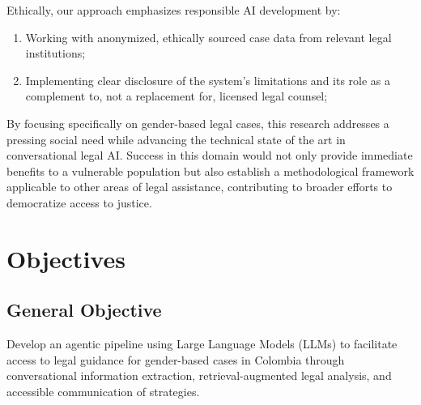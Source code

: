 Ethically, our approach emphasizes responsible AI development by:

\begin{enumerate}
\item Working with anonymized, ethically sourced case data from relevant legal institutions;
\item Implementing clear disclosure of the system’s limitations and its role as a complement to, not a replacement for, licensed legal counsel;
\end{enumerate}

By focusing specifically on gender-based legal cases, this research 
addresses a pressing social need while advancing the technical state 
of the art in conversational legal AI. Success in this domain would 
not only provide immediate benefits to a vulnerable population but also 
establish a methodological framework applicable to other areas of legal 
assistance, contributing to broader efforts to democratize access to justice.
\section{Objectives}

\subsection{General Objective}
Develop an agentic pipeline using Large Language Models (LLMs) to facilitate access to legal guidance for gender-based cases in Colombia through conversational information extraction, retrieval-augmented legal analysis, and accessible communication of strategies.


